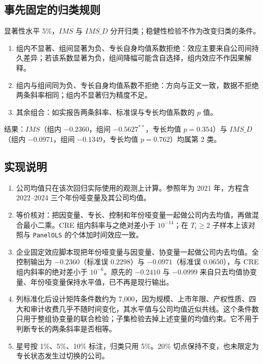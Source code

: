 \documentclass[12pt,a4paper]{article}
\begin{document}
\subsection{事先固定的归类规则}

显著性水平 5\%，$IMS$ 与 $IMS\_D$ 分开归类；稳健性检验不作为改变归类的条件。
\begin{enumerate}
\item 组内不显著、组间显著为负、专长自身均值系数拒绝：效应主要来自公司间持久差异；若该系数显著为负，组间降幅可能含自选择，组内效应不作因果解释。
\item 组内与组间同为负、专长自身均值系数不拒绝：方向与正文一致，数据不拒绝两条斜率相同；组内不显著归为精度不足。
\item 其余组合：如实报告两条斜率、标准误与专长均值系数的 $p$ 值。
\end{enumerate}
结果：$IMS$（组内 $-0.2360$，组间 $-0.5627^{**}$，专长均值 $p=0.354$）与 $IMS\_D$（组内 $-0.0971$，组间 $-0.1349$，专长均值 $p=0.762$）均属第 2 类。

\subsection{实现说明}\label{app:impl}

\begin{enumerate}
\item 公司均值只在该次回归实际使用的观测上计算。参照年为 2021 年，方程含 2022--2024 三个年份哑变量及其公司均值。
\item 等价核对：把因变量、专长、控制和年份哑变量一起做公司内去均值，再做混合最小二乘。CRE 组内斜率与之绝对差小于 $10^{-14}$；在 $T_i\ge 2$ 子样本上该对照与 \texttt{PanelOLS} 的个体加时间效应一致。
\item 企业固定效应脚本现把年份哑变量与因变量、协变量一起做公司内去均值。全控制输出为 $-0.2360$（标准误 $0.2298$）与 $-0.0971$（标准误 $0.0650$），与 CRE 组内斜率的绝对差小于 $10^{-6}$。原先的 $-0.2410$ 与 $-0.0999$ 来自只去均值协变量、年份哑变量保持水平值，已不再是现行输出。
\item 列标准化后设计矩阵条件数约为 7{,}000，因为规模、上市年限、产权性质、四大和审计收费几乎不随时间变化，其水平值与公司均值近似共线。这个条件数只用于整组协变量的联合检验；子集检验去掉上述变量的均值约束。它不用于判断专长的两条斜率是否相等。
\item 星号按 1\%、5\%、10\% 标注，归类只用 5\%。20\% 切点保持不变，也未限定为专长状态发生过切换的公司。
\end{enumerate}
\end{document}
